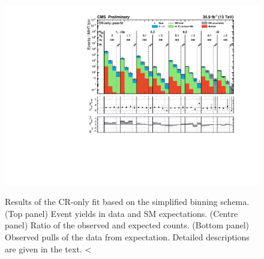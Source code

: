 \begin{figure}[h!]
  \centering
  \caption{Results of the CR-only fit based on the simplified binning
    schema. (Top panel) Event yields in data and SM
    expectations. (Centre panel) Ratio of the observed and expected
    counts. (Bottom panel) Observed pulls of the data from
    expectation. Detailed descriptions are given in the text.
<  }
  \includegraphics[width=0.95\linewidth]{figures/results/36invfb_nlo_fix/mountainRangePlots/aggregated_bins/all_cr-only.pdf} 
  \label{fig:aggregated_results}
\end{figure}

